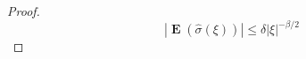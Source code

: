 \documentclass[12pt,reqno]{article}
\numberwithin{equation}{section}
\DeclareMathOperator{\ZZ}{\mathbf{Z}}
\DeclareMathOperator{\TT}{\mathbf{T}}
\numberwithin{theorem}{section}
\DeclareMathOperator{\EE}{\mathbf{E}}
\begin{document}
\begin{proof}
    \begin{equation} \label{equationOIJOJDOIJD}
        |\EE(\widehat{\sigma}(\xi))| \leq \delta |\xi|^{-\beta/2}
    \end{equation}

\end{proof}
\end{document}

